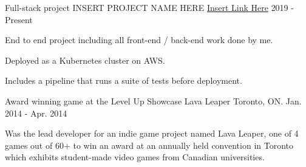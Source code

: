 

\begin{cventries}

  \cventry
    {Full-stack project} %
    {INSERT PROJECT NAME HERE} %
    {\href{https://puljak.ca}{Insert Link Here}} %
    {2019 - Present} %
    {
      \begin{cvitems} %
        \item {End to end project including all front-end / back-end work done by me.}
        \item {Deployed as a Kubernetes cluster on AWS.}
        \item {Includes a pipeline that runs a suite of tests before deployment.}
      \end{cvitems}
    }



  \cventry
    {Award winning game at the Level Up Showcase} %
    {Lava Leaper} %
    {Toronto, ON.} %
    {Jan. 2014 - Apr. 2014} %
    {
      \begin{cvitems} %
        \item {Was the lead developer for an indie game project named Lava Leaper, one of 4 games out of 60+ to win an award at an annually held convention in Toronto which exhibits student-made video games from Canadian universities.}
      \end{cvitems}
    }

\end{cventries}